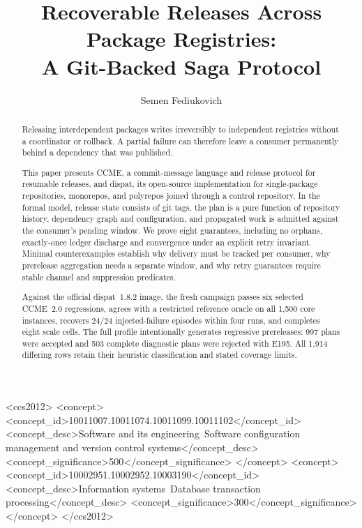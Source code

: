 \documentclass[sigconf,nonacm]{acmart}
\begin{document}
\title{Recoverable Releases Across Package Registries:\\
       A Git-Backed Saga Protocol}

\author{Semen Fediukovich}

\renewcommand{\shortauthors}{Semen Fediukovich}

\begin{abstract}
Releasing interdependent packages writes irreversibly to independent
registries without a coordinator or rollback. A partial failure can therefore
leave a consumer permanently behind a dependency that was published.

This paper presents CCME, a commit-message language and release protocol for
resumable releases, and dispat, its open-source implementation for single-package
repositories, monorepos, and polyrepos joined through a control repository.
In the formal model, release state consists of git tags, the
plan is a pure function of repository history, dependency graph and
configuration, and propagated work is admitted against the consumer's pending
window. We prove eight guarantees, including no orphans, exactly-once ledger
discharge and convergence under an explicit retry invariant. Minimal counterexamples establish why delivery must be tracked per consumer,
why prerelease aggregation needs a separate window, and why retry guarantees
require stable channel and suppression predicates.

Against the official dispat~1.8.2 image, the fresh campaign passes six selected
CCME~2.0 regressions, agrees with a restricted reference oracle on all 1{,}500 core
instances, recovers 24/24 injected-failure episodes within four runs, and
completes eight scale cells. The full profile intentionally generates
regressive prereleases: 997 plans were accepted and 503 complete diagnostic
plans were rejected with E195. All 1{,}914 differing rows retain their
heuristic classification and stated coverage limits.
\end{abstract}

\begin{CCSXML}
<ccs2012>
<concept>
<concept_id>10011007.10011074.10011099.10011102</concept_id>
<concept_desc>Software and its engineering~Software configuration management and version control systems</concept_desc>
<concept_significance>500</concept_significance>
</concept>
<concept>
<concept_id>10002951.10002952.10003190</concept_id>
<concept_desc>Information systems~Database transaction processing</concept_desc>
<concept_significance>300</concept_significance>
</concept>
</ccs2012>
\end{CCSXML}
\end{document}
